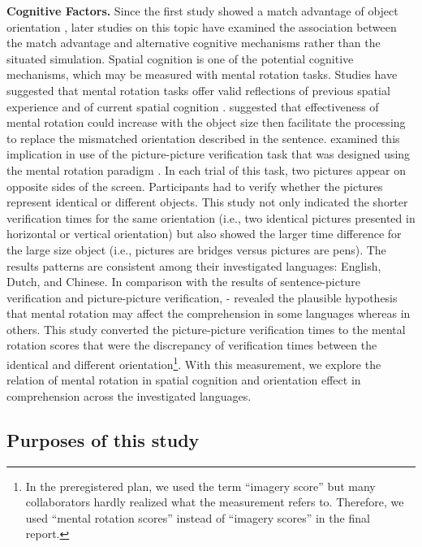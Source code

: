 \documentclass[
  man,floatsintext]{apa6}
\begin{document}
\textbf{Cognitive Factors.} Since the first study showed a match advantage of object orientation \autocite{stanfield_effect_2001}, later studies on this topic have examined the association between the match advantage and alternative cognitive mechanisms rather than the situated simulation. Spatial cognition is one of the potential cognitive mechanisms, which may be measured with mental rotation tasks. Studies have suggested that mental rotation tasks offer valid reflections of previous spatial experience \autocite{frickMentalObjectRotation2013} and of current spatial cognition \autocite{chuSpontaneousGesturesMental2008,pouwMoreEmbeddedExtended2014}. \textcite{koning_mental_2017} suggested that effectiveness of mental rotation could increase with the object size then facilitate the processing to replace the mismatched orientation described in the sentence. \textcite{chenDoesObjectSize2020} examined this implication in use of the picture-picture verification task that was designed using the mental rotation paradigm \autocite{cohenMentalRotationMental1993}. In each trial of this task, two pictures appear on opposite sides of the screen. Participants had to verify whether the pictures represent identical or different objects. This study not only indicated the shorter verification times for the same orientation (i.e., two identical pictures presented in horizontal or vertical orientation) but also showed the larger time difference for the large size object (i.e., pictures are bridges versus pictures are pens). The results patterns are consistent among their investigated languages: English, Dutch, and Chinese. In comparison with the results of sentence-picture verification and picture-picture verification, -\textcite{chenDoesObjectSize2020} revealed the plausible hypothesis that mental rotation may affect the comprehension in some languages whereas in others. This study converted the picture-picture verification times to the mental rotation scores that were the discrepancy of verification times between the identical and different orientation\footnote{In the preregistered plan, we used the term ``imagery score'' but many collaborators hardly realized what the measurement refers to. Therefore, we used ``mental rotation scores'' instead of ``imagery scores'' in the final report.}. With this measurement, we explore the relation of mental rotation in spatial cognition and orientation effect in comprehension across the investigated languages.

\hypertarget{purposes-of-this-study}{%
\subsection{Purposes of this study}\label{purposes-of-this-study}}
\end{document}
